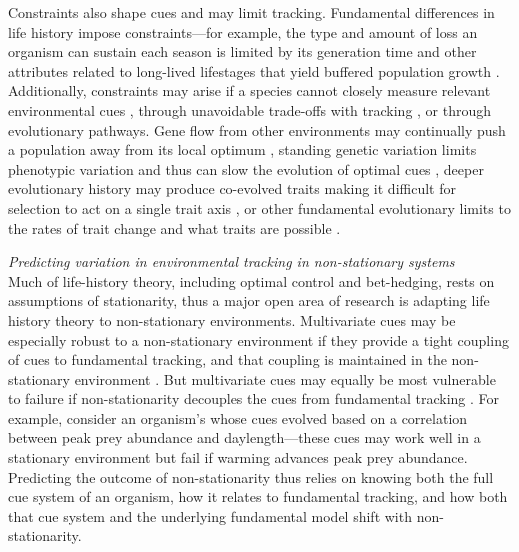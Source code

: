 \documentclass[11pt,letterpaper]{article}
\newcommand{\R}[1]{\label{#1}\linelabel{#1}}
\begin{document}
Constraints also shape cues and may limit tracking. Fundamental differences in life history impose constraints---for example, the type and amount of loss an organism can sustain each season is limited by its generation time and other attributes related to long-lived lifestages that yield buffered population growth \citep{Chesson:1997dz}. Additionally, constraints may arise if a species cannot closely measure relevant environmental cues \citep{arnold1992,Singer:2010eb}, through unavoidable trade-offs with tracking \citep{Singer:2010eb,Johansson2012}, or through evolutionary pathways. Gene flow from other environments may continually push a population away from its local optimum \citep{lenormand2002}, standing genetic variation limits phenotypic variation and thus can slow the evolution of optimal cues \citep{Franks:2007wd,ghalambor2015}, deeper evolutionary history may produce co-evolved traits making it difficult for selection to act on a single trait axis \citep{Ackerly:2009ly}, or other fundamental evolutionary limits to the rates of trait change and what traits are possible \citep{spandrels}. \R{constrain1end} 

\emph{Predicting variation in environmental tracking in non-stationary systems}\\
Much of life-history theory, including optimal control and bet-hedging, rests on assumptions of stationarity, thus a major open area of research is adapting life history theory to non-stationary environments. Multivariate cues may be especially robust to a non-stationary environment if they provide a tight coupling of cues to fundamental tracking, and that coupling is maintained in the non-stationary environment \citep{dore2018}. But multivariate cues may equally be most vulnerable to failure if non-stationarity decouples the cues from fundamental tracking \citep{bonamour2019}. For example, consider an organism's whose cues evolved based on a correlation between peak prey abundance and daylength---these cues may work well in a stationary environment but fail if warming advances peak prey abundance. Predicting the outcome of non-stationarity thus relies on knowing both the full cue system of an organism, how it relates to fundamental tracking, and how both that cue system and the underlying fundamental model shift with non-stationarity. 
\end{document}

